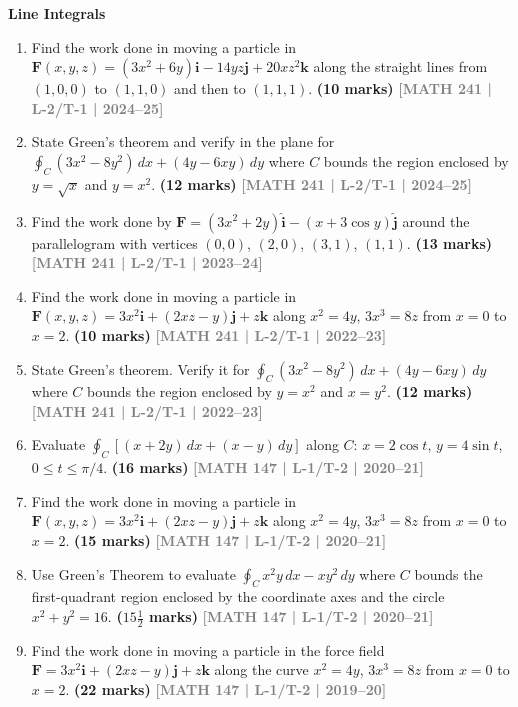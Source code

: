 \documentclass[12pt,a4paper]{article}
\newcommand{\yr}[1]{\hfill\textcolor{gray}{\small\textbf{[#1]}}}
\newcommand{\mk}[1]{\textcolor{orange!70!black}{\small\textbf{(#1 marks)}}}
\newcommand{\subtopic}[2]{%
  \vspace{10pt}
  \noindent\begin{tcolorbox}[colback=#1!8,colframe=#1,boxrule=0.6pt,arc=4pt,
    left=6pt,right=6pt,top=4pt,bottom=4pt]
    \small\bfseries\textcolor{#1}{#2}
  \end{tcolorbox}
  \vspace{2pt}
}
\begin{document}
\subtopic{cD}{Line Integrals}
\label{sub:s4-lineint}

\begin{enumerate}\item Find the work done in moving a particle in $\mathbf{F}(x,y,z)=(3x^{2}+6y)\mathbf{i}-14yz\mathbf{j}+20xz^{2}\mathbf{k}$ along the straight lines from $(1,0,0)$ to $(1,1,0)$ and then to $(1,1,1)$.
\mk{10} \yr{MATH 241 | L-2/T-1 | 2024--25}

\item State Green's theorem and verify in the plane for $\displaystyle\oint_{C}(3x^{2}-8y^{2})\,dx+(4y-6xy)\,dy$ where $C$ bounds the region enclosed by $y=\sqrt{x}$ and $y=x^{2}$.
\mk{12} \yr{MATH 241 | L-2/T-1 | 2024--25}

\item Find the work done by $\mathbf{F}=(3x^{2}+2y)\hat{\mathbf{i}}-(x+3\cos y)\hat{\mathbf{j}}$ around the parallelogram with vertices $(0,0)$, $(2,0)$, $(3,1)$, $(1,1)$.
\mk{13} \yr{MATH 241 | L-2/T-1 | 2023--24}

\item Find the work done in moving a particle in $\mathbf{F}(x,y,z)=3x^{2}\mathbf{i}+(2xz-y)\mathbf{j}+z\mathbf{k}$ along $x^{2}=4y$, $3x^{3}=8z$ from $x=0$ to $x=2$.
\mk{10} \yr{MATH 241 | L-2/T-1 | 2022--23}

\item State Green's theorem. Verify it for $\displaystyle\oint_{C}(3x^{2}-8y^{2})\,dx+(4y-6xy)\,dy$ where $C$ bounds the region enclosed by $y=x^{2}$ and $x=y^{2}$.
\mk{12} \yr{MATH 241 | L-2/T-1 | 2022--23}

\item Evaluate $\displaystyle\oint_{C}[(x+2y)\,dx+(x-y)\,dy]$ along $C$: $x=2\cos t$, $y=4\sin t$, $0\le t\le\pi/4$.
\mk{16} \yr{MATH 147 | L-1/T-2 | 2020--21}

\item Find the work done in moving a particle in $\mathbf{F}(x,y,z)=3x^{2}\mathbf{i}+(2xz-y)\mathbf{j}+z\mathbf{k}$ along $x^{2}=4y$, $3x^{3}=8z$ from $x=0$ to $x=2$.
\mk{15} \yr{MATH 147 | L-1/T-2 | 2020--21}

\item Use Green's Theorem to evaluate $\displaystyle\oint_{C}x^{2}y\,dx-xy^{2}\,dy$ where $C$ bounds the first-quadrant region enclosed by the coordinate axes and the circle $x^{2}+y^{2}=16$.
\mk{$15\tfrac{1}{2}$} \yr{MATH 147 | L-1/T-2 | 2020--21}

\item Find the work done in moving a particle in the force field $\mathbf{F}=3x^{2}\mathbf{i}+(2xz-y)\mathbf{j}+z\mathbf{k}$ along the curve $x^{2}=4y$, $3x^{3}=8z$ from $x=0$ to $x=2$.
\mk{22} \yr{MATH 147 | L-1/T-2 | 2019--20}


\end{enumerate}
\end{document}
